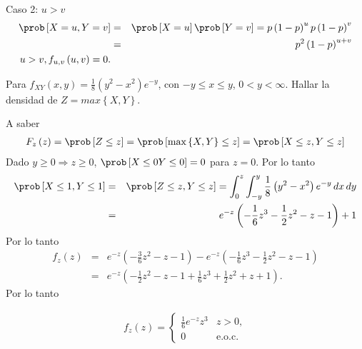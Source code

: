 \begin{Ejem}
Caso 2: $u>v$
\begin{eqnarray*}
\prob \left[X=u, Y=v \right]&=&\prob \left[X=u \right]\prob \left[Y=v \right]= p \left(1-p \right)^{u} p \left(1-p \right)^{v}\\
&=& p^{2}\left( 1-p \right) ^{u+v}\\
u>v,f_{u,v} \left(u,v \right)= 0.
\end{eqnarray*}
\end{Ejem}

\begin{Ejem}
Para $f_{XY}\left(x,y \right)= \frac{1}{8}\left(y^{2}- x^{2} \right)e^{-y}$, con $-y\leq x \leq y$, $0<y<\infty $. Hallar la densidad de $Z= max \left\{ X,Y\right\}$.
 
A saber
\begin{eqnarray*}
F_{z}\left( z \right)= \prob\left[ Z\leq z \right] = \prob \left[ \textrm{max} \left\{ X,Y \right\} \leq z \right]=\prob \left[X \leq  z, Y\leq z \right]
\end{eqnarray*}
Dado $y\geq 0 \Rightarrow z\geq 0$, $\prob \left[X\leq  0  Y \leq 0\right]= 0$ para $z=0$. Por lo tanto
\begin{eqnarray*}
\prob  \left[X \leq 1,Y\leq 1 \right]&=&\prob \left[Z\leq z,Y\leq z \right]= \int_{0}^{z}\int_{-y}^{y}\frac{1}{8}\left(y^{2}- x^{2} \right)e^{-y} \,dx\,dy\\
&=&e^{-z}\left(-\frac{1}{6}z^{3}-\frac{1}{2}z^{2}-z-1 \right)+1
\end{eqnarray*}
Por lo tanto
\begin{eqnarray*}
f_{z}\left(z \right)&=&e^{-z}\left(-\frac{3}{6}z^{2}-z-1 \right)- e^{-z}\left(-\frac{1}{6}z^{3}-\frac{1}{2}z^{2}-z-1 \right)\\
&=&e^{-z}\left(-\frac{1}{2}z^{2}-z-1+\frac{1}{6}z^{3}+\frac{1}{2}z^{2}+z+1 \right).
\end{eqnarray*}
Por lo tanto
 
\begin{eqnarray*}
f_{z}\left(z\right) = \begin{cases}
\frac{1}{6}e^{-z}z^{3} & z>0,\\  
0 & \textrm {e.o.c.}
\end{cases}  
\end{eqnarray*}
\end{Ejem}

